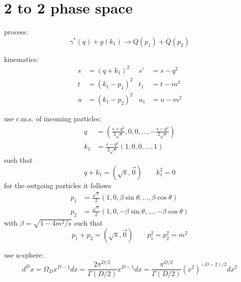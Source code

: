 \documentclass[
  ngerman,		%
  a4paper,		%
  11pt,			%
  DIV=12,		%
  parskip=half  	%
]{scrartcl}
\begin{document}
\section{2 to 2 phase space}

process:
\begin{equation}
\gamma^*(q) + g(k_1) \rightarrow Q(p_1)+\bar{Q}(p_2)
\end{equation}

kinematics:
\begin{align}
s &= (q+k_1)^2 &s' &=s-q^2\\
t &= (k_1-p_1)^2 &t_1 &= t-m^2\\
u &= (k_1-p_2)^2 &u_1 &= u-m^2
\end{align}

use c.m.s. of incoming particles:
\begin{align}
q &= \left(\frac {s+q^2}{2\sqrt s},0,0,\ldots,-\frac{s-q^2}{2\sqrt s}\right) \\
k_1 &= \frac {s-q^2}{2\sqrt s}\left(1,0,0,\ldots,1\right)
\end{align}
such that
\begin{equation}
q+k_1 = (\sqrt s,\vec 0)\qquad k_1^2 = 0
\end{equation}
for the outgoing particles it follows
\begin{align}
p_1 &= \frac{\sqrt s} 2 \left(1,0,\beta\sin\theta,\ldots,\beta\cos\theta\right)\\
p_2 &= \frac{\sqrt s} 2 \left(1,0,-\beta\sin\theta,\ldots,-\beta\cos\theta\right)
\end{align}
with $\beta = \sqrt{1-4m^2/s}$ such that
\begin{equation}
p_1+p_2 = (\sqrt s,\vec 0)\qquad p_1^2 = p_2^2 = m^2
\end{equation}

use n-sphere:
\begin{equation}
d^Dx = \Omega_D x^{D-1} dx = \frac{2\pi^{D/2}}{\Gamma(D/2)}x^{D-1} dx= \frac{\pi^{D/2}}{\Gamma(D/2)}(x^2)^{(D-2)/2} dx^2
\end{equation}
\end{document}

